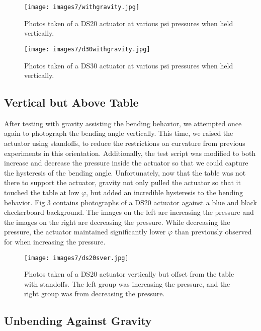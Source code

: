 \begin{figure}[h]
    \centering
     \texttt{[image: images7/withgravity.jpg]}
    \caption{Photos taken of a DS20 actuator at various psi pressures when held vertically.}
    \label{fig:withgravity}
\end{figure}

\begin{figure}[h]
    \centering
     \texttt{[image: images7/d30withgravity.jpg]}
    \caption{Photos taken of a DS30 actuator at various psi pressures when held vertically.}
    \label{fig:ds30withgravity}
\end{figure}

\clearpage
\subsection{Vertical but Above Table}

After testing with gravity assisting the bending behavior, we attempted once again to photograph the bending angle vertically. This time, we raised the actuator using standoffs, to reduce the restrictions on curvature from previous experiments in this orientation. Additionally, the test script was modified to both increase and decrease the pressure inside the actuator so that we could capture the hysteresis of the bending angle. Unfortunately, now that the table was not there to support the actuator, gravity not only pulled the actuator so that it touched the table at low $\varphi$, but added an incredible hysteresis to the bending behavior. Fig \ref{fig:ds20sver} contains photographs of a DS20 actuator against a blue and black checkerboard background. The images on the left are increasing the pressure and the images on the right are decreasing the pressure. While decreasing the pressure, the actuator maintained significantly lower $\varphi$ than previously observed for when increasing the pressure. 

\begin{figure}[h]
    \centering
     \texttt{[image: images7/ds20sver.jpg]}
    \caption{Photos taken of a DS20 actuator vertically but offset from the table with standoffs. The left group was increasing the pressure, and the right group was from decreasing the pressure.}
    \label{fig:ds20sver}
\end{figure}

\clearpage
\subsection{Unbending Against Gravity}

